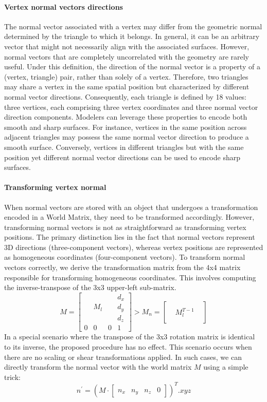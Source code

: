 \paragraph*{Vertex normal vectors directions}
The normal vector associated with a vertex may differ from the geometric normal determined by the triangle to which it belongs.
In general, it can be an arbitrary vector that might not necessarily align with the associated surfaces. 
However, normal vectors that are completely uncorrelated with the geometry are rarely useful.
Under this definition, the direction of the normal vector is a property of a (vertex, triangle) pair, rather than solely of a vertex. 
Therefore, two triangles may share a vertex in the same spatial position but characterized by different normal vector directions.
Consequently, each triangle is defined by 18 values: three vertices, each comprising three vertex coordinates and three normal vector direction components.
Modelers can leverage these properties to encode both smooth and sharp surfaces. 
For instance, vertices in the same position across adjacent triangles may possess the same normal vector direction to produce a smooth surface. 
Conversely, vertices in different triangles but with the same position yet different normal vector directions can be used to encode sharp surfaces.

\paragraph*{Transforming vertex normal}
When normal vectors are stored with an object that undergoes a transformation encoded in a World Matrix, they need to be transformed accordingly. 
However, transforming normal vectors is not as straightforward as transforming vertex positions.
The primary distinction lies in the fact that normal vectors represent 3D directions (three-component vectors), whereas vertex positions are represented as homogeneous coordinates (four-component vectors).
To transform normal vectors correctly, we derive the transformation matrix from the 4x4 matrix responsible for transforming homogeneous coordinates. 
This involves computing the inverse-transpose of the 3x3 upper-left sub-matrix.
\[M=\begin{bmatrix} &  &  & d_x \\ & M_l &  & d_y \\ &  &  & d_z \\ 0 & 0 & 0 & 1 \end{bmatrix}>M_n=\begin{bmatrix} &  &  \\ & M_l^{T-1} & \\ &  & \end{bmatrix}\]
In a special scenario where the transpose of the 3x3 rotation matrix is identical to its inverse, the proposed procedure has no effect. 
This scenario occurs when there are no scaling or shear transformations applied.
In such cases, we can directly transform the normal vector with the world matrix $M$ using a simple trick:
\[n^\prime=\left(M\cdot\begin{bmatrix} n_x & n_y & n_z & 0 \end{bmatrix}\right)^T.xyz\]

